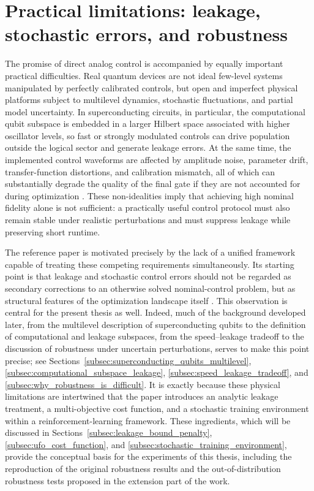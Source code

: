 \section{Practical limitations: leakage, stochastic errors, and robustness}
\label{subsec:intro_practical_limitations}

The promise of direct analog control is accompanied by equally important practical difficulties. Real quantum devices are not ideal few-level systems manipulated by perfectly calibrated controls, but open and imperfect physical platforms subject to multilevel dynamics, stochastic fluctuations, and partial model uncertainty. In superconducting circuits, in particular, the computational qubit subspace is embedded in a larger Hilbert space associated with higher oscillator levels, so fast or strongly modulated controls can drive population outside the logical sector and generate leakage errors. At the same time, the implemented control waveforms are affected by amplitude noise, parameter drift, transfer-function distortions, and calibration mismatch, all of which can substantially degrade the quality of the final gate if they are not accounted for during optimization \cite{Niu2019,Krantz2019,Kjaergaard2020,Koch2022}. These non-idealities imply that achieving high nominal fidelity alone is not sufficient: a practically useful control protocol must also remain stable under realistic perturbations and must suppress leakage while preserving short runtime.

The reference paper is motivated precisely by the lack of a unified framework capable of treating these competing requirements simultaneously. Its starting point is that leakage and stochastic control errors should not be regarded as secondary corrections to an otherwise solved nominal-control problem, but as structural features of the optimization landscape itself \cite{Niu2019}. This observation is central for the present thesis as well. Indeed, much of the background developed later, from the multilevel description of superconducting qubits to the definition of computational and leakage subspaces, from the speed--leakage tradeoff to the discussion of robustness under uncertain perturbations, serves to make this point precise; see Sections~\ref{subsec:superconducting_qubits_multilevel}, \ref{subsec:computational_subspace_leakage}, \ref{subsec:speed_leakage_tradeoff}, and \ref{subsec:why_robustness_is_difficult}. It is exactly because these physical limitations are intertwined that the paper introduces an analytic leakage treatment, a multi-objective cost function, and a stochastic training environment within a reinforcement-learning framework. These ingredients, which will be discussed in Sections~\ref{subsec:leakage_bound_penalty}, \ref{subsec:ufo_cost_function}, and \ref{subsec:stochastic_training_environment}, provide the conceptual basis for the experiments of this thesis, including the reproduction of the original robustness results and the out-of-distribution robustness tests proposed in the extension part of the work.

